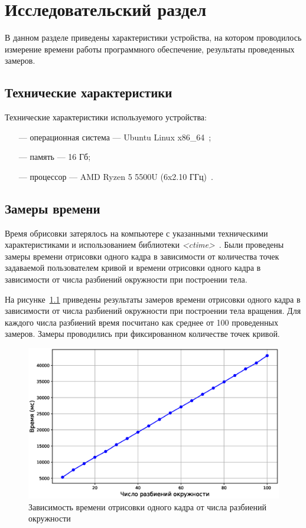 \chapter{Исследовательский раздел}
В данном разделе приведены характеристики устройства, на котором проводилось измерение времени работы программного обеспечение, результаты проведенных замеров.

\section{Технические характеристики}
Технические характеристики используемого устройства:
\begin{itemize}
    \item[---] операционная система --- Ubuntu Linux x86\_64~\cite{Ubuntu};
    \item[---] память --- 16 Гб;
    \item[---] процессор --- AMD Ryzen 5 5500U (6x2.10 ГГц)~\cite{AMD}.
\end{itemize}

\section{Замеры времени}
Время обрисовки затерялось на компьютере с указанными техническими характеристиками и использованием библиотеки \textit{<ctime>}~\cite{ctime}. Были проведены замеры времени отрисовки одного кадра в зависимости от количества точек задаваемой пользователем кривой и времени отрисовки одного кадра в зависимости от числа разбиений окружности при построении тела.

На рисунке~\ref{fig:poly} приведены  результаты замеров времени отрисовки одного кадра в зависимости от числа разбиений окружности при построении тела вращения. Для каждого числа разбиений время посчитано как среднее от 100 проведенных замеров. Замеры проводились при фиксированном количестве точек кривой.

\begin{figure}[H]
	\centering
	\includegraphics[scale=0.6]{img/graph_poly.eps}
	\caption{Зависимость времени отрисовки одного кадра от числа разбиений окружности}
	\label{fig:poly}
\end{figure}


